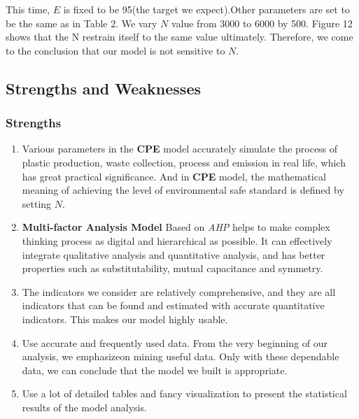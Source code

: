 \documentclass{mcmthesis}
\begin{document}
This time, $E$ is fixed to be 95(the target we expect).Other parameters are set to be the same as in Table 2.
We vary $N$ value from 3000 to 6000 by 500. Figure 12 shows that the N restrain itself to the same value ultimately. Therefore, we come to the conclusion
that our model is not sensitive to $N$. 



 \subsection{Strengths and Weaknesses}
 \subsubsection{Strengths}
	\begin{enumerate}
	 \item Various parameters in the \textbf{CPE} model accurately simulate the process of plastic production, waste collection, process and emission in real life, which has great practical significance. And in \textbf{CPE} model, the mathematical meaning of achieving the level of environmental safe standard is defined by setting $N$.
	 \item \textbf{Multi-factor Analysis Model} Based on \textit{AHP} helps to make complex thinking process as digital and hierarchical as possible. It can effectively integrate qualitative analysis and quantitative analysis, and has better properties such as substitutability, mutual capacitance and symmetry.
     \item The indicators we consider are relatively comprehensive, and they are all indicators that can be found and estimated with accurate quantitative indicators. This makes our model highly usable. \\
     \item Use accurate and frequently used data. From the very beginning of our analysis, we emphasizeon mining useful data.  Only with these dependable data, we can conclude that the model we built is appropriate.\\
     \item Use a lot of detailed tables and fancy visualization to present the statistical results of the model analysis.\\
	
	\end{enumerate}
 
\end{document}
